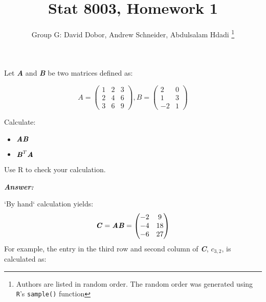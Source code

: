 \documentclass[12pt]{article}
\newcommand{\blditA}{\textbf{\textit{A}}}
\newcommand{\blditB}{\textbf{\textit{B}}}
\newcommand{\blditC}{\textbf{\textit{C}}}
\newenvironment{question}[2][Question]{\begin{trivlist}
\item[\hskip \labelsep {\bfseries #1}\hskip \labelsep {\bfseries #2.}]}{\end{trivlist}}
\begin{document}
 

 
\title{Stat 8003, Homework 1}%
\author{Group G: David Dobor, Andrew Schneider,  Abdulsalam Hdadi 
\footnote{Authors are listed in random order. The random order was generated using \texttt{R}'s \texttt{sample()} function}
\\ %
} %
 
\maketitle
 
 
\begin{question}{1.1} %
Let \blditA $ $ and \blditB $ $ be two matrices defined as:

\begin{equation*}
A = \begin{pmatrix}
  1 & 2 & 3\\
  2 & 4 & 6\\
  3 & 6 & 9
\end{pmatrix},
B = \begin{pmatrix}
  2 & 0\\
  1 & 3\\
 -2 & 1
\end{pmatrix}
\end{equation*}

Calculate:

\begin{itemize}
  \item $\blditA \blditB$
  \item $\blditB^T \blditA $
\end{itemize}

Use R to check your calculation.

 \end{question}
 
 
 \textbf{\emph{Answer:} }
 
`By hand` calculation yields:
\begin{equation*}
\blditC  = \blditA \blditB = 
\begin{pmatrix}
  -2 & 9\\
  -4 & 18\\
  -6 & 27
\end{pmatrix}
\end{equation*}
 For example, the entry in the third row and second column of \blditC, $c_{3,2}$, is calculated as:
 
\end{document}
